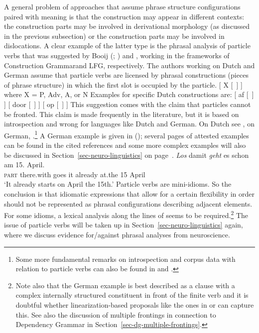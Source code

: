 \begin{exe}
\begin{xlist}[iv.]
\begin{exe}
\begin{xlist}[iv.]
A general problem of approaches that assume phrase structure configurations paired with meaning is
that the construction may appear in different contexts: the construction parts may be involved in
derivational morphology (as discussed in the previous subsection) or the construction parts may be
involved in dislocations. A clear example of the latter type is the phrasal analysis of particle
verbs that was suggested by Booij (\citeyear[Section~2]{Booij2002a}; \citeyear{Booij2012a-u}) and  \citet{Blom2005a}, working in the
frameworks of Construction Grammar\indexcxg and LFG\indexlfg, respectively. The authors working on Dutch and German assume that particle verbs are licensed by
phrasal constructions (pieces of phrase structure) in which the first slot is occupied by the particle. 
\ea
{}[ X [~] ] where X = P, Adv, A, or N
\z
Examples for specific Dutch constructions are:
\eal
\label{particle-konstruktionen}
\ex {}[ af   [~] ]
\ex {}[ door [~] ]
\ex {}[ op   [~] ]
\zl 
This suggestion comes with the claim that particles cannot be fronted.  This claim is made
frequently in the literature, but it is based on introspection and wrong for languages like Dutch and German. On Dutch see , on German,
.\footnote{%
Some more fundamental remarks on
introspection and corpus data with relation to particle verbs can also be found in
 and .
} 
A German example is given in (); several pages of attested examples can be found in the cited references and some more complex examples will
also be discussed in Section~\ref{sec-neuro-linguistics} on page~\pageref{ex-complex-vf}.
\ea\label{bsp-los-damit-zwei}
\gll \emph{Los} damit \emph{geht} es schon am 15. April.\footnotemark\\
     \textsc{part} there.with goes it already at.the 15 April\\%
%
\glt `It already starts on April the 15th.'
\z
Particle verbs are mini-idioms. So the conclusion is that idiomatic expressions that 
allow for a certain flexibility in order should not be represented as phrasal configurations describing adjacent
elements. For some idioms, a lexical analysis along the lines of  seems to be
required.\footnote{%
  Note also that the German example is best described as a clause with a complex internally 
  structured constituent in front of the finite verb and it is doubtful whether linearization-based
  proposals like the ones in  or  can capture
  this. See also the discussion of multiple frontings in connection to Dependency Grammar in Section~\ref{sec-dg-multiple-frontings}.
}
The issue of particle verbs will be taken up in Section~\ref{sec-neuro-linguistics} again, where we
discuss evidence for/against phrasal analyses from neuroscience.




\end{xlist}
\end{exe}
\end{xlist}
\end{exe}
